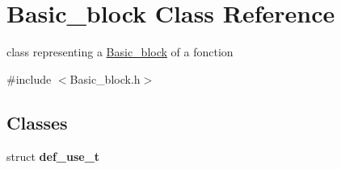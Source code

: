 \hypertarget{classBasic__block}{\section{\-Basic\-\_\-block \-Class \-Reference}
\label{classBasic__block}
}


class representing a \hyperlink{classBasic__block}{\-Basic\-\_\-block} of a fonction  




{\ttfamily \#include $<$\-Basic\-\_\-block.\-h$>$}

\subsection*{\-Classes}
\begin{DoxyCompactItemize}
\item 
struct {\bfseries def\-\_\-use\-\_\-t}
\end{DoxyCompactItemize}

